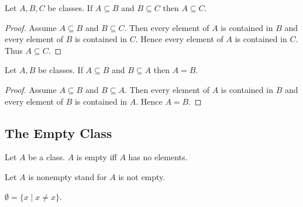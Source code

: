 \documentclass[10pt]{article}
\begin{document}
  \begin{forthel}
    \begin{proposition}[id=FOUNDATIONS_01_3939677545431040,printid]
      Let $A, B, C$ be classes.
      If $A \subseteq B$ and $B \subseteq C$ then $A \subseteq C$.
    \end{proposition}
    \begin{proof}
      Assume $A \subseteq B$ and $B \subseteq C$.
      Then every element of $A$ is contained in $B$ and every element of $B$ is contained in $C$.
      Hence every element of $A$ is contained in $C$.
      Thus $A \subseteq C$.
    \end{proof}
  \end{forthel}

  \begin{forthel}
    \begin{proposition}[id=FOUNDATIONS_01_7159957847801856,printid]
      Let $A, B$ be classes.
      If $A \subseteq B$ and $B \subseteq A$ then $A = B$.
    \end{proposition}
    \begin{proof}
      Assume $A \subseteq B$ and $B \subseteq A$.
      Then every element of $A$ is contained in $B$ and every element of $B$ is contained in $A$.
      Hence $A = B$.
    \end{proof}
  \end{forthel}


  \subsection*{The Empty Class}

  \begin{forthel}
    \begin{definition}[id=FOUNDATIONS_01_6252477624090624,printid]
      Let $A$ be a class.
      $A$ is empty iff $A$ has no elements.
    \end{definition}

    Let $A$ is nonempty stand for $A$ is not empty.
  \end{forthel}

  \begin{forthel}
    \begin{definition}[id=FOUNDATIONS_01_7939928493129728,printid]
      $\emptyset = \{ x \mid x \neq x \}$.
    \end{definition}
  \end{forthel}
\end{document}
